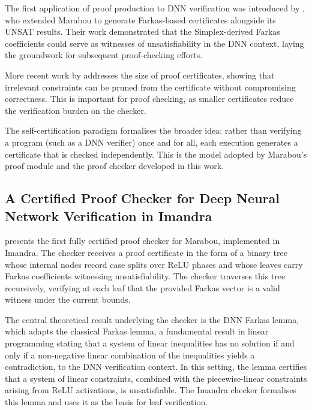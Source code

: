 The first application of proof production to DNN verification was introduced by \citet{nn_proof_production}, who extended Marabou to generate Farkas-based certificates alongside its UNSAT results. Their work demonstrated that the Simplex-derived Farkas coefficients could serve as witnesses of unsatisfiability in the DNN context, laying the groundwork for subsequent proof-checking efforts.

More recent work by \citet{proof_minimization_in_nn_verification} addresses the size of proof certificates, showing that irrelevant constraints can be pruned from the certificate without compromising correctness. This is important for proof checking, as smaller certificates reduce the verification burden on the checker.

The self-certification paradigm \cite{program_correctness} formalises the broader idea: rather than verifying a program (such as a DNN verifier) once and for all, each execution generates a certificate that is checked independently. This is the model adopted by Marabou's proof module and the proof checker developed in this work.

\subsection{A Certified Proof Checker for Deep Neural Network Verification in Imandra}

\citet{certified_proof_checker} presents the first fully certified proof checker for Marabou, implemented in Imandra. The checker receives a proof certificate in the form of a binary tree whose internal nodes record case splits over ReLU phases and whose leaves carry Farkas coefficients witnessing unsatisfiability. The checker traverses this tree recursively, verifying at each leaf that the provided Farkas vector is a valid witness under the current bounds.

The central theoretical result underlying the checker is the DNN Farkas lemma, which adapts the classical Farkas lemma, a fundamental result in linear programming stating that a system of linear inequalities has no solution if and only if a non-negative linear combination of the inequalities yields a contradiction, to the DNN verification context. In this setting, the lemma certifies that a system of linear constraints, combined with the piecewise-linear constraints arising from ReLU activations, is unsatisfiable. The Imandra checker formalises this lemma and uses it as the basis for leaf verification.

